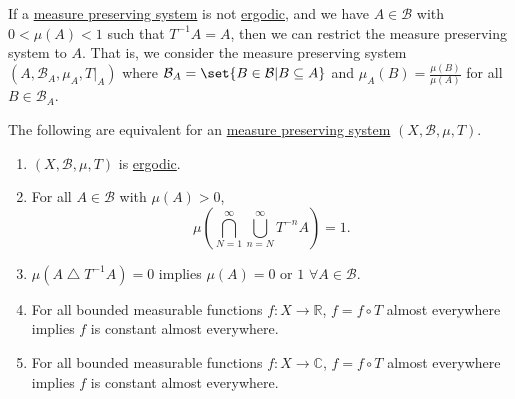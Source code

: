\documentclass{article}
\newcommand{\sym}{\bigtriangleup}
\begin{document}
If a \hyperlink{def:mps}{measure preserving system} is not \hyperlink{def:ergodic}{ergodic}, and we have $A \in \mathcal{B}$ with $0 < \mu(A) < 1$ such that $T^{-1} A = A$, then we can restrict the measure preserving system to $A$.
That is, we consider the measure preserving system $(A, \mathcal{B}_A, \mu_A, T|_A)$ where $\mathcal{B}_A = \set{B \in \mathcal{B} | B \subseteq A}$ and $\mu_A(B) = \frac{\mu(B)}{\mu(A)}$ for all $B \in \mathcal{B}_A$.
\begin{thm}
  The following are equivalent for an \hyperlink{def:mps}{measure preserving system} $(X, \mathcal{B}, \mu,T)$.
  \begin{enumerate}[label=(\arabic*)]
    \item $(X, \mathcal{B}, \mu, T)$ is \hyperlink{def:ergodic}{ergodic}.
    \item For all $A \in \mathcal{B}$ with $\mu(A) > 0$,
      \begin{equation*}
        \mu\left(\bigcap_{N=1}^\infty \bigcup_{n=N}^\infty T^{-n} A\right) = 1.
      \end{equation*}
    \item $\mu(A \sym T^{-1} A) = 0$ implies $\mu(A) = 0$ or $1$ $\forall A \in \mathcal{B}$.
    \item For all bounded measurable functions $f: X \to \mathbb{R}$,
      $f = f \circ T$ almost everywhere implies $f$ is constant almost everywhere.
    \item For all bounded measurable functions $f: X \to \mathbb{C}$,
      $f = f \circ T$ almost everywhere implies $f$ is constant almost everywhere.
  \end{enumerate}
\end{thm}
\end{document}
